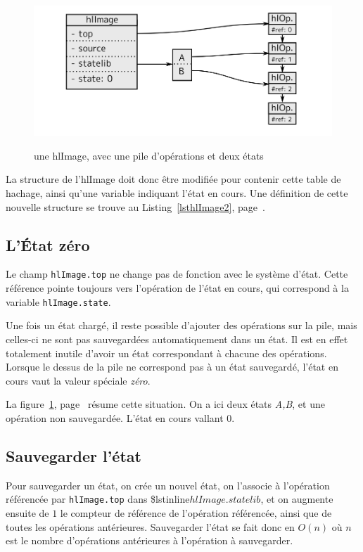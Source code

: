		\begin{figure}[ht]
			\centering
			\includegraphics[width=\textwidth]{images/hlImage2} 
			\label{fig:hlImage2}
			\caption{une hlImage, avec une pile d'opérations et deux états}
		\end{figure}

			La structure de l'hlImage doit donc être modifiée pour contenir cette table de hachage, ainsi qu'une variable indiquant l'état en cours.
			Une définition de cette nouvelle structure se trouve au Listing~\ref{lsthlImage2}, page~\pageref{lsthlImage2}.
		\subsection{L'État zéro}
		Le champ \lstinline$hlImage.top$ ne change pas de fonction avec le système d'état. Cette référence pointe toujours vers 
		l'opération de l'état en cours, qui correspond à la variable 
		\lstinline$hlImage.state$. 

		Une fois un état chargé, il reste possible d'ajouter des opérations sur la pile, mais celles-ci ne sont pas sauvegardées automatiquement dans
		un état. Il est en effet totalement inutile d'avoir un état correspondant à chacune des opérations. 
		Lorsque le dessus de la pile ne correspond pas à un état sauvegardé, l'état en cours vaut la valeur spéciale \emph{zéro}.

		La figure~\ref{fig:hlImage2}, page~\pageref{fig:hlImage2} résume cette situation. On a ici deux états \emph{A,B}, et une opération non sauvegardée.
		L'état en cours vallant $0$.

		\subsection{Sauvegarder l'état}
		Pour sauvegarder un état, on crée un nouvel état, on l'associe à l'opération référencée par \lstinline$hlImage.top$ dans 
		\$lstinline$hlImage.statelib$, et on augmente ensuite de $1$ le compteur de référence de l'opération référencée, ainsi que de toutes les opérations
		antérieures. Sauvegarder l'état se fait donc en $O(n)$ où $n$ est le nombre d'opérations antérieures à l'opération à sauvegarder.
